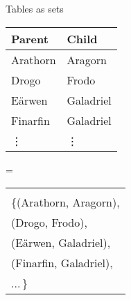 \documentclass[xcolor=table,usenames,dvipsnames,svgnames]{beamer}
\begin{document}

\begin{frame}{Tables as sets}\large
  \begin{minipage}{0.4\textwidth}
    \centering
    \begin{tabular}{ll}
      \textbf{Parent} & \textbf{Child}\\\midrule
      Arathorn & Aragorn\\
      Drogo & Frodo\\
      E\"arwen & Galadriel\\
      Finarfin & Galadriel\\
      \hfill\vdots & \hfill\vdots
    \end{tabular}


  \end{minipage}
  \hfill{\LARGE =}\hfill
  \begin{minipage}{0.53\textwidth}
    \centering

    \begin{tabular}{l}
      \color{gray}{// set of (parent, child) pairs}\\
      \{(Arathorn, Aragorn),\\
      \phantom{\{}(Drogo, Frodo),\\
      \phantom{\{}(E\"arwen, Galadriel),\\
      \phantom{\{}(Finarfin, Galadriel),\\
      \phantom{\{}...\,\} \phantom{\vdots}
    \end{tabular}

  \end{minipage}

\end{frame}




\end{document}
